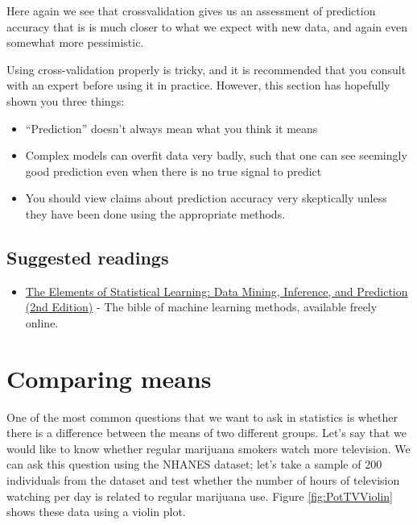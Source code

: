 \documentclass[]{book}
\providecommand{\tightlist}{%
  \setlength{\itemsep}{0pt}\setlength{\parskip}{0pt}}
\theoremstyle{definition}
\theoremstyle{definition}
\theoremstyle{definition}
\theoremstyle{remark}
\begin{document}
Here again we see that crossvalidation gives us an assessment of
prediction accuracy that is is much closer to what we expect with new
data, and again even somewhat more pessimistic.

Using cross-validation properly is tricky, and it is recommended that
you consult with an expert before using it in practice. However, this
section has hopefully shown you three things:

\begin{itemize}
\tightlist
\item
  ``Prediction'' doesn't always mean what you think it means
\item
  Complex models can overfit data very badly, such that one can see
  seemingly good prediction even when there is no true signal to predict
\item
  You should view claims about prediction accuracy very skeptically
  unless they have been done using the appropriate methods.
\end{itemize}

\section{Suggested readings}\label{suggested-readings-10}

\begin{itemize}
\tightlist
\item
  \href{https://web.stanford.edu/~hastie/Papers/ESLII.pdf}{The Elements
  of Statistical Learning: Data Mining, Inference, and Prediction (2nd
  Edition)} - The bible of machine learning methods, available freely
  online.
\end{itemize}

\chapter{Comparing means}\label{comparing-means}

One of the most common questions that we want to ask in statistics is
whether there is a difference between the means of two different groups.
Let's say that we would like to know whether regular marijuana smokers
watch more television. We can ask this question using the NHANES
dataset; let's take a sample of 200 individuals from the dataset and
test whether the number of hours of television watching per day is
related to regular marijuana use. Figure \ref{fig:PotTVViolin} shows
these data using a violin plot.
\end{document}
